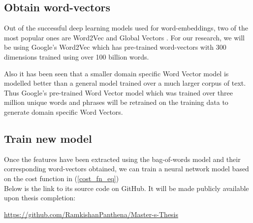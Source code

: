 \subsection{Obtain word-vectors}

Out of the successful deep learning models used for word-embeddings, two of the most popular ones are Word2Vec \cite{le2014distributed} and Global Vectors \cite{pennington2014glove}. For our research, we will be using Google's Word2Vec which has pre-trained word-vectors with 300 dimensions trained using over 100 billion words. 

Also it has been seen that a smaller domain specific Word Vector model is modelled better than a general model trained over a much larger corpus of text. Thus Google's pre-trained Word Vector model which was trained over three million unique words and phrases will be retrained on the training data to generate domain specific Word Vectors.

\subsection{Train new model}

Once the features have been extracted using the bag-of-words model and their corresponding word-vectors obtained, we can train a neural network model based on the cost function in (\ref{cost_fn_eq})\\

\noindent Below is the link to its source code on GitHub. It will be made publicly available upon thesis completion:

\noindent \url{https://github.com/RamkishanPanthena/Master-s-Thesis}